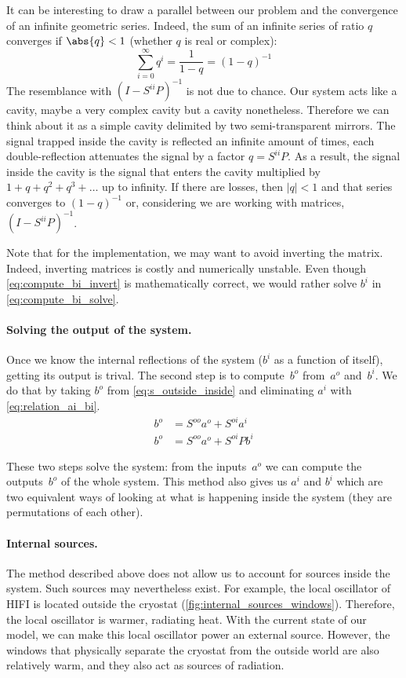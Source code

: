 It can be interesting to draw a parallel between our problem and the convergence of an infinite geometric series.
Indeed, the sum of an infinite series of ratio $q$ converges if $\abs{q} < 1$ (whether $q$ is real or complex):
\begin{equation}
    \sum_{i=0}^\infty q^i = \frac{1}{1-q} = (1-q)^{-1}
\end{equation}
The resemblance with $(I - S^{ii}P)^{-1}$ is not due to chance.
Our system acts like a cavity, maybe a very complex cavity but a cavity nonetheless.
Therefore we can think about it as a simple cavity delimited by two semi-transparent mirrors.
The signal trapped inside the cavity is reflected an infinite amount of times, each double-reflection attenuates the signal by a factor $q=S^{ii}P$.
As a result, the signal inside the cavity is the signal that enters the cavity multiplied by $1+q+q^2+q^3+\dots$ up to infinity.
If there are losses, then $|q|<1$ and that series converges to $(1-q)^{-1}$ or, considering we are working with matrices, $(I - S^{ii}P)^{-1}$.

Note that for the implementation, we may want to avoid inverting the matrix.
Indeed, inverting matrices is costly and numerically unstable.
Even though \cref{eq:compute_bi_invert} is mathematically correct, we would rather solve $b^i$ in \cref{eq:compute_bi_solve}.

\paragraph{Solving the output of the system.}
Once we know the internal reflections of the system ($b^i$ as a function of itself), getting its output is trival.
The second step is to compute~$b^o$ from~$a^o$ and~$b^i$.
We do that by taking $b^o$ from \cref{eq:s_outside_inside} and eliminating $a^i$ with \cref{eq:relation_ai_bi}.
\begin{align}
    b^o &= S^{oo}a^o + S^{oi}a^i \\
    b^o &= S^{oo}a^o + S^{oi}Pb^i \label{eq:compute_bo}
\end{align}

These two steps solve the system: from the inputs~$a^o$ we can compute the outputs~$b^o$ of the whole system.
This method also gives us $a^i$ and $b^i$ which are two equivalent ways of looking at what is happening inside the system (they are permutations of each other).



\paragraph{Internal sources.}
The method described above does not allow us to account for sources inside the system.
Such sources may nevertheless exist.
For example, the local oscillator of HIFI is located outside the cryostat (\cref{fig:internal_sources_windows}).
Therefore, the local oscillator is warmer, radiating heat.
With the current state of our model, we can make this local oscillator power an external source.
However, the windows that physically separate the cryostat from the outside world are also relatively warm, and they also act as sources of radiation.

